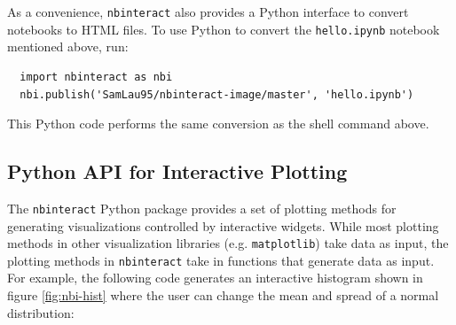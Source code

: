 \documentclass[nobib]{tufte-handout}
\newcommand{\code}[1]{\texttt{#1}}
\begin{document}
As a convenience, \code{nbinteract} also provides a Python interface to convert
notebooks to HTML files. To use Python to convert the \code{hello.ipynb}
notebook mentioned above, run:

\begin{verbatim}
  import nbinteract as nbi
  nbi.publish('SamLau95/nbinteract-image/master', 'hello.ipynb')
\end{verbatim}

This Python code performs the same conversion as the shell command above.


\subsection{Python API for Interactive Plotting} %
\label{sub:python_api_for_interactive_plotting}

The \code{nbinteract} Python package provides a set of plotting methods for
generating visualizations controlled by interactive widgets. While most
plotting methods in other visualization libraries (e.g. \code{matplotlib}) take
data as input, the plotting methods in \code{nbinteract} take in functions that
generate data as input. For example, the following code generates an
interactive histogram shown in figure \ref{fig:nbi-hist} where the user can
change the mean and spread of a normal distribution:
\end{document}
